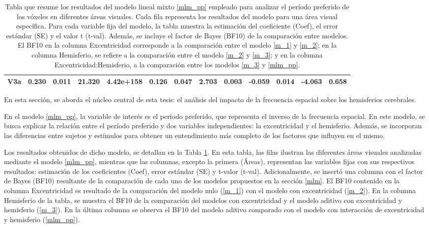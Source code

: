 \begin{table}[h]
{\begin{tabular}{@{}lcccccccccccc@{}}
		V3a & 0.230 & 0.011 & 21.320 & 4.42e+158 & 0.126 & 0.047 & 2.703 & 0.003 & -0.059 & 0.014 & -4.063 & 0.658 \\
		\bottomrule
	\end{tabular}
	\caption{Tabla que resume los resultados del modelo lineal mixto \ref{mlm_pp} empleado para analizar el per\'iodo preferido de los v\'oxeles en diferentes áreas visuales. Cada fila representa los resultados del modelo para una área visual específica. Para cada variable fija del modelo, la tabla muestra la estimación del coeficiente (Coef), el error estándar (SE) y el valor t (t-val). Además, se incluye el factor de Bayes (BF10) de la comparación entre modelos. El BF10 en la columna Excentricidad corresponde a la comparación entre el modelo \ref{m_1} y \ref{m_2}; en la columna Hemisferio, se refiere a la comparación entre el modelo \ref{m_2} y \ref{m_3}; y en la columna Excentricidad:Hemisferio, a la comparación entre los modelos \ref{m_3} y \ref{mlm_pp}.}
	\label{tab:mlm_results_pp}
}
\end{table}

En esta secci\'on, se aborda el núcleo central de esta tesis: el análisis del impacto de la frecuencia espacial sobre los hemisferios cerebrales. 

En el modelo \ref{mlm_pp}, la variable de interés es el per\'iodo preferido, que representa el inverso de la frecuencia espacial. En este modelo, se busca explicar la relación entre el per\'iodo preferido y dos variables independientes: la excentricidad y el hemisferio. Además, se incorporan las diferencias entre sujetos y estímulos para obtener un entendimiento más completo de los factores que influyen en el mismo.

Los resultados obtenidos de dicho modelo, se detallan en la Tabla \ref{tab:mlm_results_pp}. En esta tabla, las filas ilustran las diferentes áreas visuales analizadas mediante el modelo \ref{mlm_pp}, mientras que las columnas, excepto la primera (\'Areas), representan las variables fijas con sus respectivos resultados:  estimación de los coeficientes (Coef), error estándar (SE) y t-valor (t-val). Adicionalmente, se insert\'o una columna con el factor de Bayes (BF10) resultante de la comparaci\'on de cada uno de los modelos propuestos en la secci\'on \ref{mlm}. El BF10 contenido en la columna Excentricidad es resultado de la comparaci\'on del modelo nulo (\ref{m_1}) con el modelo con excentricidad (\ref{m_2}). En la columna Hemisferio de la tabla, se muestra el BF10 de la comparaci\'on del modelos con excentricidad  y el modelo aditivo con excentricidad y hemisferio (\ref{m_3}). En la \'ultima columna se observa el BF10 del modelo aditivo comparado con el modelo con interacci\'on de excentricidad y hemisferio (\ref{mlm_pp}).


